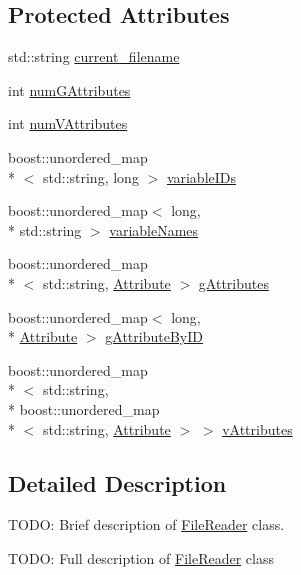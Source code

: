 \subsection*{Protected Attributes}
\begin{DoxyCompactItemize}
\item 
std\-::string \hyperlink{classccmc_1_1_file_reader_a2afb0635bf14f222991efc4d63e5f17a}{current\-\_\-filename}
\item 
int \hyperlink{classccmc_1_1_file_reader_a783e31e2f08cade8e52842f752c796ea}{num\-G\-Attributes}
\item 
int \hyperlink{classccmc_1_1_file_reader_a9e1e8aee145ed817cf02f293c244cc03}{num\-V\-Attributes}
\item 
boost\-::unordered\-\_\-map\\*
$<$ std\-::string, long $>$ \hyperlink{classccmc_1_1_file_reader_af87bd665411c9c8ce943040ff5b13055}{variable\-I\-Ds}
\item 
boost\-::unordered\-\_\-map$<$ long, \\*
std\-::string $>$ \hyperlink{classccmc_1_1_file_reader_a94d580d26fd966be477efb3fd9877ea9}{variable\-Names}
\item 
boost\-::unordered\-\_\-map\\*
$<$ std\-::string, \hyperlink{classccmc_1_1_attribute}{Attribute} $>$ \hyperlink{classccmc_1_1_file_reader_a5bf4b49e31f23ce0d5a0098809ea464a}{g\-Attributes}
\item 
boost\-::unordered\-\_\-map$<$ long, \\*
\hyperlink{classccmc_1_1_attribute}{Attribute} $>$ \hyperlink{classccmc_1_1_file_reader_a4225f8abbbb74ca9a18b9a0ea419f978}{g\-Attribute\-By\-I\-D}
\item 
boost\-::unordered\-\_\-map\\*
$<$ std\-::string, \\*
boost\-::unordered\-\_\-map\\*
$<$ std\-::string, \hyperlink{classccmc_1_1_attribute}{Attribute} $>$ $>$ \hyperlink{classccmc_1_1_file_reader_a1eb038b0d8cb945df2b02c4cb63d0aa3}{v\-Attributes}
\end{DoxyCompactItemize}


\subsection{Detailed Description}
T\-O\-D\-O\-: Brief description of \hyperlink{classccmc_1_1_file_reader}{File\-Reader} class. 

T\-O\-D\-O\-: Full description of \hyperlink{classccmc_1_1_file_reader}{File\-Reader} class 


